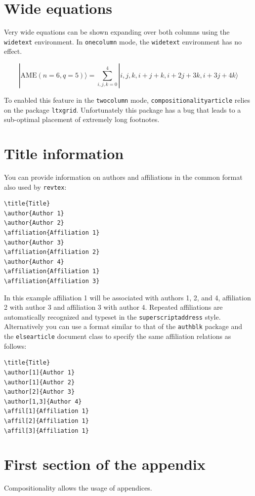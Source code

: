 \documentclass[a4paper,onecolumn,superscriptaddress,10pt,issue=1, volume=2, shorttitle=papers]{compositionalityarticle}
\begin{document}
\section{Wide equations}
Very wide equations can be shown expanding over both columns using the \texttt{widetext} environment.
In \texttt{onecolumn} mode, the \texttt{widetext} environment has no effect.
\begin{widetext}
  \begin{equation}
|\mathrm{AME}(n=6,q=5)\rangle=\sum_{i,j,k=0}^4 |i,j,k,i+j+k,i+2j+3k,i+3j+4k\rangle
  \end{equation}
\end{widetext}
To enabled this feature in the \texttt{twocolumn} mode, \texttt{compositionalityarticle} relies on the package \texttt{ltxgrid}.
Unfortunately this package has a bug that leads to a sub-optimal placement of extremely long footnotes.

\section{Title information}
You can provide information on authors and affiliations in the common format also used by \texttt{revtex}:
\begin{verbatim}
\title{Title}
\author{Author 1}
\author{Author 2}
\affiliation{Affiliation 1}
\author{Author 3}
\affiliation{Affiliation 2}
\author{Author 4}
\affiliation{Affiliation 1}
\affiliation{Affiliation 3}
\end{verbatim}
In this example affiliation 1 will be associated with authors 1, 2, and 4, affiliation 2 with author 3 and affiliation 3 with author 4.
Repeated affiliations are automatically recognized and typeset in the \texttt{superscriptaddress} style.
Alternatively you can use a format similar to that of the \texttt{authblk} package and the \texttt{elsearticle} document class to specify the same affiliation relations as follows:
\begin{verbatim}
\title{Title}
\author[1]{Author 1}
\author[1]{Author 2}
\author[2]{Author 3}
\author[1,3]{Author 4}
\affil[1]{Affiliation 1}
\affil[2]{Affiliation 1}
\affil[3]{Affiliation 1}
\end{verbatim}






\appendix

\section{First section of the appendix}
Compositionality allows the usage of appendices.
\end{document}
